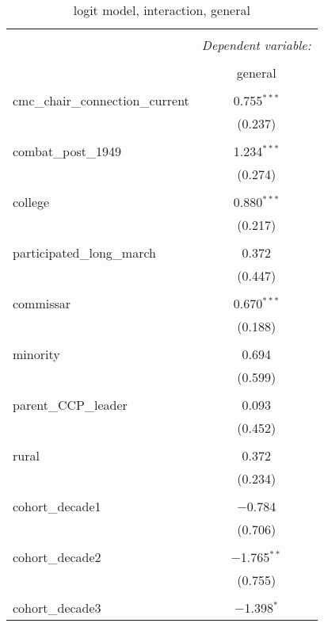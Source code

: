 \documentclass[12pt,letterpaper]{article}
\begin{document}
\begin{table}[!htbp] \centering 
	\caption{logit model, interaction, general} 
	\label{} 
	\rmfamily
	\scriptsize
	\begin{tabular}{@{\extracolsep{5pt}}lc} 
		\\[-1.8ex]\hline 
		\hline \\[-1.8ex] 
		& \multicolumn{1}{c}{\textit{Dependent variable:}} \\ 
		\cline{2-2} 
		\\[-1.8ex] & general \\ 
		\hline \\[-1.8ex] 
		cmc\_chair\_connection\_current & 0.755$^{***}$ \\ 
		& (0.237) \\ 
		& \\ 
		combat\_post\_1949 & 1.234$^{***}$ \\ 
		& (0.274) \\ 
		& \\ 
		college & 0.880$^{***}$ \\ 
		& (0.217) \\ 
		& \\ 
		participated\_long\_march & 0.372 \\ 
		& (0.447) \\ 
		& \\ 
		commissar & 0.670$^{***}$ \\ 
		& (0.188) \\ 
		& \\ 
		minority & 0.694 \\ 
		& (0.599) \\ 
		& \\ 
		parent\_CCP\_leader & 0.093 \\ 
		& (0.452) \\ 
		& \\ 
		rural & 0.372 \\ 
		& (0.234) \\ 
		& \\ 
		cohort\_decade1 & $-$0.784 \\ 
		& (0.706) \\ 
		& \\ 
		cohort\_decade2 & $-$1.765$^{**}$ \\ 
		& (0.755) \\ 
		& \\ 
		cohort\_decade3 & $-$1.398$^{*}$ \\ 

\end{tabular}
\end{table}
\end{document}
